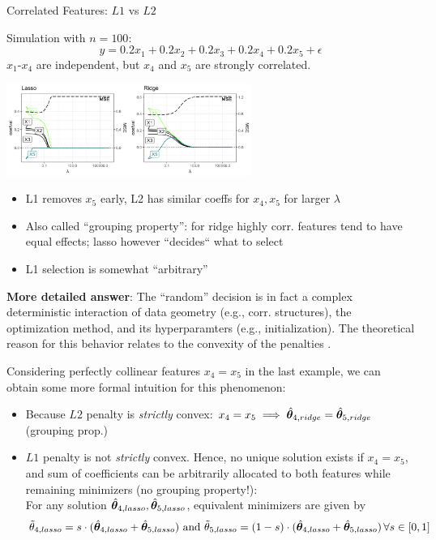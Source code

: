 \documentclass[11pt,compress,t,notes=noshow, xcolor=table]{beamer}
\begin{document}
\begin{vbframe}{Correlated Features: $L1$ vs $L2$}


Simulation with $n=100$: 
$$y = 0.2x_1 + 0.2x_2 + 0.2x_3 + 0.2x_4 + 0.2x_5 + \epsilon$$
$x_1$-$x_4$ are independent, but $x_4$ and $x_5$ are strongly correlated.

\begin{center}
\includegraphics[width=0.6\textwidth]{figure/multicollinearity_example.png}
\end{center}


\begin{itemize}
\item L1 removes $x_5$ early, L2 has similar coeffs for $x_4, x_5$ for larger $\lambda$
\item Also called ``grouping property'': for ridge highly corr. features tend to have equal effects; lasso however ``decides`` what to select
\item L1 selection is somewhat ``arbitrary''
\end{itemize}

\framebreak

\textbf{More detailed answer}: The ``random'' decision is in fact a complex deterministic interaction of data geometry (e.g., corr. structures), the optimization method, and its hyperparamters (e.g., initialization). The theoretical reason for this behavior relates to the convexity of the penalties .

\vspace{0.1cm}

Considering perfectly collinear features $x_4=x_5$ in the last example, we can obtain some more formal intuition for this phenomenon:
\vspace{0.15cm}
\begin{itemize}
    \item Because $L2$ penalty is \textit{strictly} convex: $x_4=x_5 \implies \hat{\bm{\theta}}_{4, ridge}=\hat{\bm{\theta}}_{5, ridge}$ (grouping prop.)
    \item $L1$ penalty is not \textit{strictly} convex. Hence, no unique solution exists if $x_4=x_5$, and sum of coefficients can be arbitrarily allocated to both features while remaining minimizers (no grouping property!):\\
    For any solution $\hat{\bm{\theta}}_{4,lasso},\hat{\bm{\theta}}_{5,lasso}$, equivalent minimizers are given by 
    \vspace{-0.1cm}
    {\small $$\Tilde{\theta}_{4,lasso}=s\cdot(\hat{\bm{\theta}}_{4,lasso}+\hat{\bm{\theta}}_{5,lasso}) \,\,\text{and}\,\,\Tilde{\theta}_{5,lasso}=(1-s)\cdot(\hat{\bm{\theta}}_{4,lasso}+\hat{\bm{\theta}}_{5,lasso})\,\forall s\in[0,1]$$}
\end{itemize}


\end{vbframe}
\end{document}
